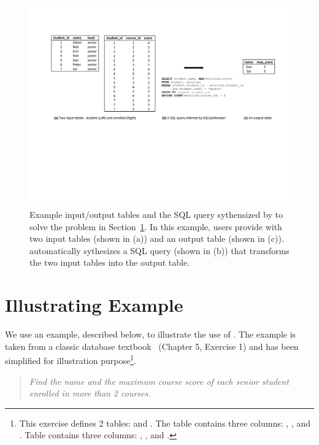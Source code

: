 
\begin{figure}[t]
  \centering
  \includegraphics[scale=0.75]{motivating}
  \vspace*{-1.0ex}\caption {{\label{fig:motivating}
  Example input/output tables and the SQL query sythensized by
  \ourtool to solve the problem in Section~\ref{sec:example}. In this example, users provide \ourtool with
  two input tables (shown in (a)) and an output table (shown in (c)).
  \ourtool automatically sythesizes a SQL query (shown in (b)) that
  transforms the two input tables into the output table.
}}
\end{figure}

\section{Illustrating Example}
\label{sec:example}

We use an example, described below, to illustrate the use
of \ourtool. The example is taken from a classic
database textbook~\cite{cowbook} (Chapter 5, Exercise 1)
and has been simplified for illustration purpose\footnote{
This exercise defines 2 tables: 
and . The  table
contains three columns: , ,
and . Table  contains
three columns: , ,
and .
}.

\begin{quote}
\textit{Find the name and the maximum course score of each senior student
enrolled in more than 2 courses.}
\end{quote}

